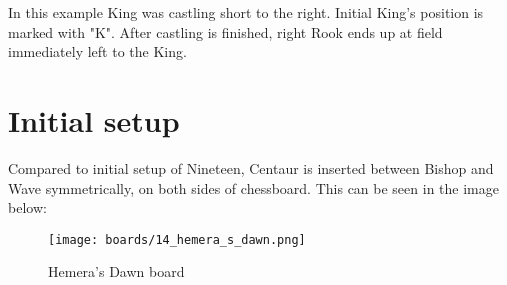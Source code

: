 In this example King was castling short to the right. Initial King's position is
marked with "K". After castling is finished, right Rook ends up at field immediately
left to the King.

\clearpage %

\section*{Initial setup}
\label{sec:Hemera's Dawn/Initial setup}

Compared to initial setup of Nineteen, Centaur is inserted between Bishop and Wave
symmetrically, on both sides of chessboard. This can be seen in the image below:

\noindent
\begin{figure}[h]
\texttt{[image: boards/14\_hemera\_s\_dawn.png]}
\caption{Hemera's Dawn board}
\label{fig:14_hemera_s_dawn}
\end{figure}

\clearpage %
